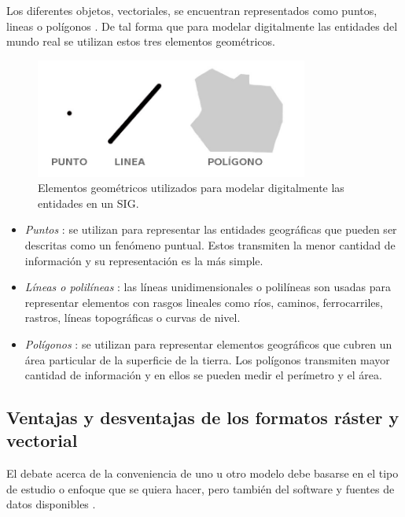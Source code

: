 Los diferentes objetos, vectoriales, se encuentran representados como puntos, lineas o polígonos
\cite{fAlonsoSig2006}. De tal forma que para modelar digitalmente las entidades del mundo real se
utilizan estos tres elementos geométricos.

\begin{figure}
\centering
\includegraphics[width=0.8\textwidth]{capitulo-2/graphics/dimensiones-datos.jpg}
\caption{\label{fig:sig-xyz} Elementos geométricos utilizados para modelar digitalmente las entidades en un SIG.}
\end{figure}

\begin{itemize}
    \item \textit{Puntos} : se utilizan para representar las entidades geográficas que pueden ser
    descritas como un fenómeno puntual. Estos transmiten la menor cantidad de información y su representación es la más simple.

    \item \textit{Líneas o polilíneas} : las líneas unidimensionales o polilíneas son usadas para
    representar elementos con rasgos lineales como ríos, caminos, ferrocarriles, rastros, líneas
    topográficas o curvas de nivel.

    \item \textit{Polígonos} : se utilizan para representar elementos geográficos que cubren un
    área particular de la superficie de la tierra. Los polígonos transmiten mayor cantidad de
    información y en ellos se pueden medir el perímetro y el área.
\end{itemize}

\subsection{Ventajas y desventajas de los formatos ráster y vectorial}

El debate acerca de la conveniencia de uno u otro modelo debe basarse en el tipo de estudio o
enfoque que se quiera hacer, pero también del software y fuentes de datos disponibles
\cite{fAlonsoSig2006}.

